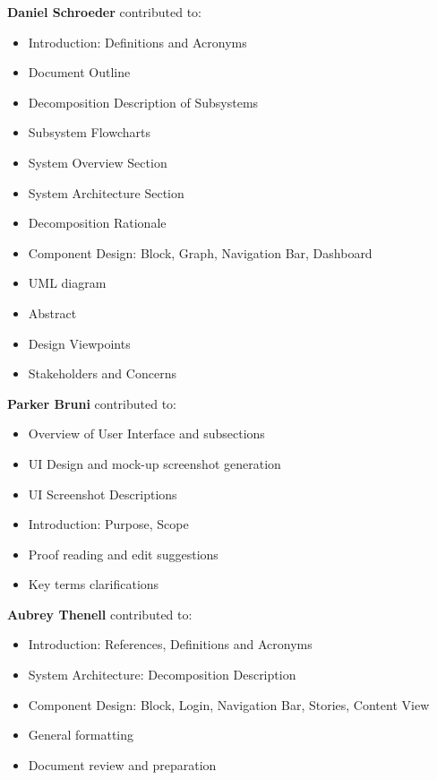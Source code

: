 \documentclass[journal,10pt,onecolumn,compsoc]{IEEEtran}
\begin{document}
       \noindent\textbf{Daniel Schroeder} contributed to: 
       \begin{itemize}
           \item Introduction: Definitions and Acronyms
           \item Document Outline 
           \item Decomposition Description of Subsystems
           \item Subsystem Flowcharts
           \item System Overview Section
           \item System Architecture Section
           \item Decomposition Rationale
           \item Component Design: Block, Graph, Navigation Bar, Dashboard
           \item UML diagram
           \item Abstract
           \item Design Viewpoints
           \item Stakeholders and Concerns
       \end{itemize}
       \noindent\textbf{Parker Bruni} contributed to:
       \begin{itemize}
       	   \item Overview of User Interface and subsections
           \item UI Design and mock-up screenshot generation
           \item UI Screenshot Descriptions
           \item Introduction: Purpose, Scope
	   \item Proof reading and edit suggestions
	   \item Key terms clarifications
       \end{itemize}
       \noindent\textbf{Aubrey Thenell} contributed to:
       \begin{itemize} 
			\item Introduction: References, Definitions and Acronyms
			\item System Architecture: Decomposition Description
			\item Component Design: Block, Login, Navigation Bar, Stories, Content View
			\item General formatting
			\item Document review and preparation
       \end{itemize}
       
       \newpage
    \clearpage
    
\end{document}
